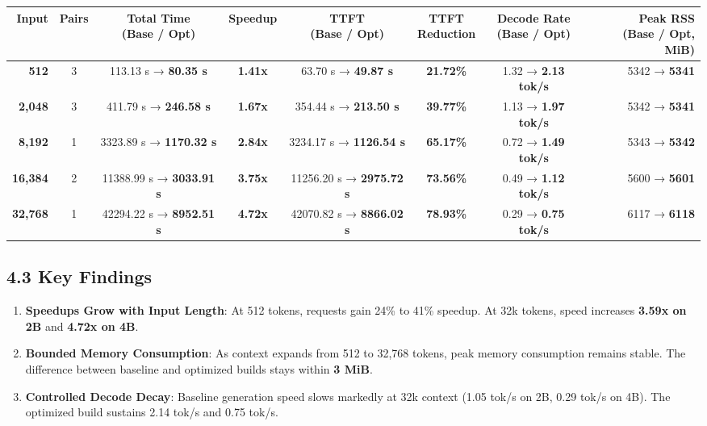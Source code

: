 \documentclass[10pt,a4paper]{article}
\begin{document}
\begin{scriptsize}
\setlength{\tabcolsep}{2.5pt}
\begin{tabular*}{\textwidth}{@{\extracolsep{\fill}}rccccccr@{}}
\toprule
\textbf{Input} & \textbf{Pairs} & \shortstack{\textbf{Total Time}\\\textbf{(Base / Opt)}} & \textbf{Speedup} & \shortstack{\textbf{TTFT}\\\textbf{(Base / Opt)}} & \shortstack{\textbf{TTFT}\\\textbf{Reduction}} & \shortstack{\textbf{Decode Rate}\\\textbf{(Base / Opt)}} & \shortstack{\textbf{Peak RSS}\\\textbf{(Base / Opt, MiB)}} \\
\midrule
\textbf{512} & 3 & 113.13 s → \textbf{80.35 s} & \textbf{1.41x} & 63.70 s → \textbf{49.87 s} & \textbf{21.72\%} & 1.32 → \textbf{2.13 tok/s} & 5342 → \textbf{5341} \\
\textbf{2,048} & 3 & 411.79 s → \textbf{246.58 s} & \textbf{1.67x} & 354.44 s → \textbf{213.50 s} & \textbf{39.77\%} & 1.13 → \textbf{1.97 tok/s} & 5342 → \textbf{5341} \\
\textbf{8,192} & 1 & 3323.89 s → \textbf{1170.32 s} & \textbf{2.84x} & 3234.17 s → \textbf{1126.54 s} & \textbf{65.17\%} & 0.72 → \textbf{1.49 tok/s} & 5343 → \textbf{5342} \\
\textbf{16,384} & 2 & 11388.99 s → \textbf{3033.91 s} & \textbf{3.75x} & 11256.20 s → \textbf{2975.72 s} & \textbf{73.56\%} & 0.49 → \textbf{1.12 tok/s} & 5600 → \textbf{5601} \\
\textbf{32,768} & 1 & 42294.22 s → \textbf{8952.51 s} & \textbf{4.72x} & 42070.82 s → \textbf{8866.02 s} & \textbf{78.93\%} & 0.29 → \textbf{0.75 tok/s} & 6117 → \textbf{6118} \\
\bottomrule
\end{tabular*}
\end{scriptsize}

\subsection{4.3 Key Findings}
\begin{enumerate}
  \item \textbf{Speedups Grow with Input Length}: At 512 tokens, requests gain 24\% to 41\% speedup. At 32k tokens, speed increases \textbf{3.59x on 2B} and \textbf{4.72x on 4B}.
  \item \textbf{Bounded Memory Consumption}: As context expands from 512 to 32,768 tokens, peak memory consumption remains stable. The difference between baseline and optimized builds stays within \textbf{3 MiB}.
  \item \textbf{Controlled Decode Decay}: Baseline generation speed slows markedly at 32k context (1.05 tok/s on 2B, 0.29 tok/s on 4B). The optimized build sustains 2.14 tok/s and 0.75 tok/s.
\end{enumerate}
\end{document}
